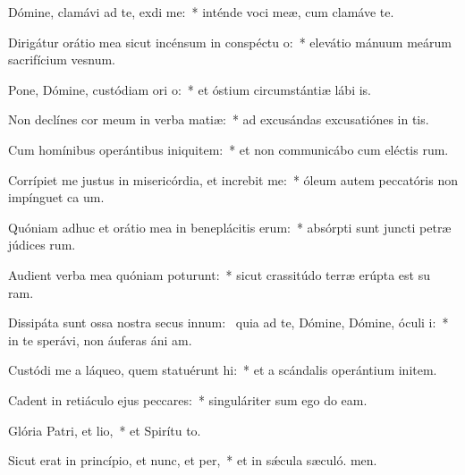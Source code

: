 \item Dómine, clamávi ad te, exdi me:~* inténde voci meæ, cum clamáve  te.
\item Dirigátur orátio mea sicut incénsum in conspéctu o:~* elevátio mánuum meárum sacrifícium vesnum.
\item Pone, Dómine, custódiam ori o:~* et óstium circumstántiæ lábi is.
\item Non declínes cor meum in verba matiæ:~* ad excusándas excusatiónes in tis.
\item Cum homínibus operántibus iniquitem:~* et non communicábo cum eléctis rum.
\item Corrípiet me justus in misericórdia, et increbit me:~* óleum autem peccatóris non impínguet ca um.
\item Quóniam adhuc et orátio mea in beneplácitis erum:~* absórpti sunt juncti petræ júdices rum.
\item Audient verba mea quóniam poturunt:~* sicut crassitúdo terræ erúpta est su ram.
\item Dissipáta sunt ossa nostra secus innum:~\pscross{} quia ad te, Dómine, Dómine, óculi i:~* in te sperávi, non áuferas áni am.
\item Custódi me a láqueo, quem statuérunt hi:~* et a scándalis operántium initem.
\item Cadent in retiáculo ejus peccares:~* singuláriter sum ego do eam.
\item Glória Patri, et lio,~* et Spirítu to.
\item Sicut erat in princípio, et nunc, et per,~* et in sǽcula sæculó. men.
